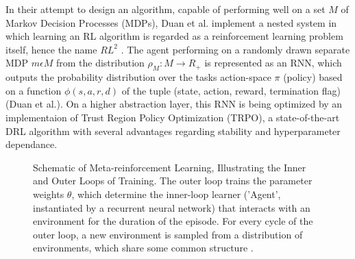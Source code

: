 \documentclass[letterpaper, 10 pt, conference]{ieeeconf}  %
\begin{document}
In their attempt to design an algorithm, capable of performing well on a set $M$ of Markov Decision Processes (MDPs), Duan et al. implement a nested
system in which learning an RL algorithm is regarded as a reinforcement learning problem itself, hence the name $RL^2$
\cite{duanRLFastReinforcement2016}. The agent performing 
on a randomly drawn separate MDP $m \epsilon M$ from the distribution $\rho_{M} : M \longrightarrow R_{+}$ is represented as an RNN,
which outputs the probability distribution over the tasks action-space $\pi$ (policy) based on a function $\phi (s,a,r,d)$ of 
the tuple (state, action, reward, termination flag) (Duan et al.). On a higher abstraction layer, this RNN is being 
optimized by an implementaion of Trust Region Policy Optimization (TRPO), a 
state-of-the-art DRL algorithm \cite{schulmanTrustRegionPolicy2015} with several advantages regarding stability
 and hyperparameter dependance.\newline

\begin{figure}[thpb]
        \centering
  \caption{Schematic of Meta-reinforcement Learning, Illustrating the Inner and Outer Loops of Training. The
  outer loop trains the parameter weights $\theta$, which determine the inner-loop learner (’Agent’, instantiated by a recurrent
  neural network) that interacts with an environment for the duration of the episode. For every cycle of the outer loop, a new
  environment is sampled from a distribution of environments, which share some common structure \cite{botvinickReinforcementLearningFast2019}.}
        \label{figurelabel}
     \end{figure}
\end{document}
